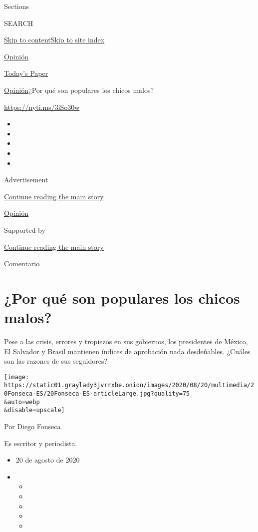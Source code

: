Sections

SEARCH

\protect\hyperlink{site-content}{Skip to
content}\protect\hyperlink{site-index}{Skip to site index}

\href{https://www.nytimes3xbfgragh.onion/es/section/opinion}{Opinión}

\href{https://myaccount.nytimes3xbfgragh.onion/auth/login?response_type=cookie\&client_id=vi}{}

\href{https://www.nytimes3xbfgragh.onion/section/todayspaper}{Today's
Paper}

\href{/es/section/opinion}{Opinión}\textbar{}¿Por qué son populares los
chicos malos?

\url{https://nyti.ms/3iSo30w}

\begin{itemize}
\item
\item
\item
\item
\item
\end{itemize}

Advertisement

\protect\hyperlink{after-top}{Continue reading the main story}

\href{/es/section/opinion}{Opinión}

Supported by

\protect\hyperlink{after-sponsor}{Continue reading the main story}

Comentario

\hypertarget{por-quuxe9-son-populares-los-chicos-malos}{%
\section{¿Por qué son populares los chicos
malos?}\label{por-quuxe9-son-populares-los-chicos-malos}}

Pese a las crisis, errores y tropiezos en sus gobiernos, los presidentes
de México, El Salvador y Brasil mantienen índices de aprobación nada
desdeñables. ¿Cuáles son las razones de sus seguidores?

\texttt{[image: https://static01.graylady3jvrrxbe.onion/images/2020/08/20/multimedia/20Fonseca-ES/20Fonseca-ES-articleLarge.jpg?quality=75\\\&auto=webp\\\&disable=upscale]}

Por Diego Fonseca

Es escritor y periodista.

\begin{itemize}
\item
  20 de agosto de 2020
\item
  \begin{itemize}
  \item
  \item
  \item
  \item
  \item
  \end{itemize}
\end{itemize}

